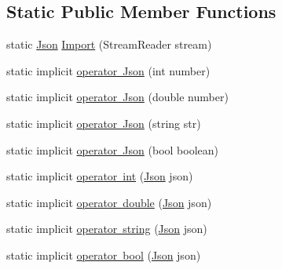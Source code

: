 \subsection*{Static Public Member Functions}
\begin{DoxyCompactItemize}
\item 
static \mbox{\hyperlink{class_eagle_eye_1_1_models_1_1_json}{Json}} \mbox{\hyperlink{class_eagle_eye_1_1_models_1_1_json_ae79a899679f529bfebb18683afd1c9d1}{Import}} (Stream\+Reader stream)
\item 
static implicit \mbox{\hyperlink{class_eagle_eye_1_1_models_1_1_json_a2116f2d9d1d806f4cdc6afee774b7945}{operator Json}} (int number)
\item 
static implicit \mbox{\hyperlink{class_eagle_eye_1_1_models_1_1_json_a2a8bcde77f6eacf7e1b80e69cdbf71dd}{operator Json}} (double number)
\item 
static implicit \mbox{\hyperlink{class_eagle_eye_1_1_models_1_1_json_a5c1034bc7b7079844e4a1a22af60e098}{operator Json}} (string str)
\item 
static implicit \mbox{\hyperlink{class_eagle_eye_1_1_models_1_1_json_aae9601c0e30fb42bab9eebfa7493bf37}{operator Json}} (bool boolean)
\item 
static implicit \mbox{\hyperlink{class_eagle_eye_1_1_models_1_1_json_a2af5ba2026820d0c8fdc671ee0b46a4d}{operator int}} (\mbox{\hyperlink{class_eagle_eye_1_1_models_1_1_json}{Json}} json)
\item 
static implicit \mbox{\hyperlink{class_eagle_eye_1_1_models_1_1_json_aa26017e55f0d47af0b446c02c0899102}{operator double}} (\mbox{\hyperlink{class_eagle_eye_1_1_models_1_1_json}{Json}} json)
\item 
static implicit \mbox{\hyperlink{class_eagle_eye_1_1_models_1_1_json_adddb99cd1e17f4bd10547a6178f61288}{operator string}} (\mbox{\hyperlink{class_eagle_eye_1_1_models_1_1_json}{Json}} json)
\item 
static implicit \mbox{\hyperlink{class_eagle_eye_1_1_models_1_1_json_a396aab5debc375cb57b9e2ce58c932fd}{operator bool}} (\mbox{\hyperlink{class_eagle_eye_1_1_models_1_1_json}{Json}} json)
\end{DoxyCompactItemize}
